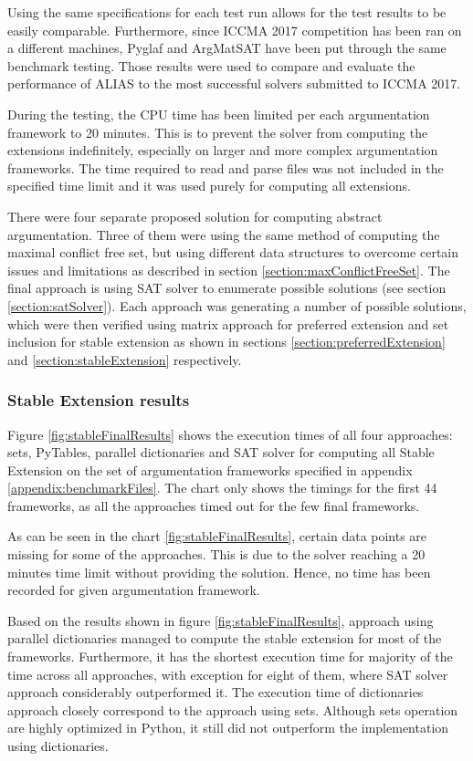 Using the same specifications for each test run allows for the test results to be easily comparable. Furthermore, since ICCMA 2017 competition has been ran on a different machines, Pyglaf \citep{pyglaf} and ArgMatSAT \citep{argmatSat} have been put through the same benchmark testing. Those results were used to compare and evaluate the performance of ALIAS to the most successful solvers submitted to ICCMA 2017.

During the testing, the CPU time has been limited per each argumentation framework to 20 minutes. This is to prevent the solver from computing the extensions indefinitely, especially on larger and more complex argumentation frameworks. The time required to read and parse files was not included in the specified time limit and it was used purely for computing all extensions. 

There were four separate proposed solution for computing abstract argumentation. Three of them were using the same method of computing the maximal conflict free set, but using different data structures to overcome certain issues and limitations as described in section \ref{section:maxConflictFreeSet}. The final approach is using SAT solver to enumerate possible solutions (see section \ref{section:satSolver}). Each approach was generating a number of possible solutions, which were then verified using matrix approach for preferred extension and set inclusion for stable extension as shown in sections \ref{section:preferredExtension} and \ref{section:stableExtension} respectively. 

\subsubsection{Stable Extension results} \label{section:stableExtensionResults}
Figure \ref{fig:stableFinalResults} shows the execution times of all four approaches: sets, PyTables, parallel dictionaries and SAT solver for computing all Stable Extension on the set of argumentation frameworks specified in appendix \ref{appendix:benchmarkFiles}. The chart only shows the timings for the first 44 frameworks, as all the approaches timed out for the few final frameworks.

As can be seen in the chart \ref{fig:stableFinalResults}, certain data points are missing for some of the approaches. This is due to the solver reaching a 20 minutes time limit without providing the solution. Hence, no time has been recorded for given argumentation framework.

Based on the results shown in figure \ref{fig:stableFinalResults}, approach using parallel dictionaries managed to compute the stable extension for most of the frameworks. Furthermore, it has the shortest execution time for majority of the time across all approaches, with exception for eight of them, where SAT solver approach considerably outperformed it. The execution time of dictionaries approach closely correspond to the approach using sets. Although sets operation are highly optimized in Python, it still did not outperform the implementation using dictionaries.


